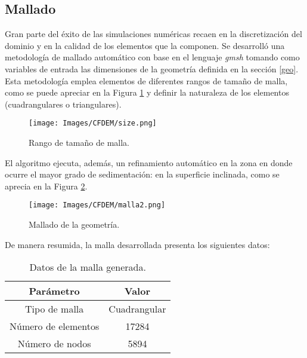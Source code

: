 \subsection{Mallado}

\noindent
\justify

Gran parte del \'exito de las simulaciones num\'ericas recaen en la discretizaci\'on del dominio y en la calidad de los elementos que la componen. Se desarroll\'o una metodolog\'ia de mallado autom\'atico con base en el lenguaje \textit{gmsh} tomando como variables de entrada las dimensiones de la geometr\'ia definida en la secci\'on \ref{geo}. Esta metodolog\'ia emplea elementos de diferentes rangos de tama\~no de malla, como se puede apreciar en la Figura \ref{rango} y definir la naturaleza de los elementos (cuadrangulares o triangulares).

\begin{figure}[h!]
	\centering
	\texttt{[image: Images/CFDEM/size.png]}
	\caption{Rango de tama\~no de malla.}
	\label{rango}
\end{figure}

\noindent
\justify

El algoritmo ejecuta, adem\'as, un refinamiento autom\'atico en la zona en donde ocurre el mayor grado de sedimentaci\'on: en la superficie inclinada, como se aprecia en la Figura \ref{malla:geo}.

\begin{figure}[h!]
	\centering
	\texttt{[image: Images/CFDEM/malla2.png]}
	\caption{Mallado de la geometr\'ia.}
	\label{malla:geo}
\end{figure}

\noindent
\justify

De manera resumida, la malla desarrollada presenta los siguientes datos:

\begin{table}[h!]
	\centering
	\begin{tabular}{|c|c|}
		\hline
		\textbf{Par\'ametro} & \textbf{Valor} \\ \hline
		Tipo de malla & Cuadrangular \\ \hline
		N\'umero de elementos & 17284 \\ \hline
		N\'umero de nodos & 5894 \\ \hline	
	\end{tabular}
	\caption{Datos de la malla generada.}
	\label{malla}
\end{table}